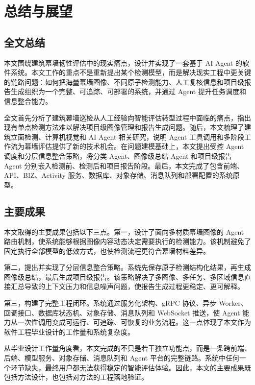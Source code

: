 \chapter{总结与展望}
\label{chap:conclusion}

\section{全文总结}
\label{sec:conclusion-summary}

本文围绕建筑幕墙韧性评估中的现实痛点，设计并实现了一套基于 AI Agent 的软件系统。本文工作的重点不是重新提出某个检测模型，而是解决现实工程中更关键的链路问题：如何把海量幕墙图像、不同原子检测能力、人工复核信息和项目级报告生成组织为一个完整、可追踪、可部署的系统，并通过 Agent 提升任务调度和信息整合能力。

全文首先分析了建筑幕墙巡检从人工经验向智能评估转型过程中面临的痛点，指出现有单点检测方法难以解决项目级图像管理和报告生成问题。随后，本文梳理了建筑立面检测、计算机视觉和 AI Agent 相关研究，说明 Agent 工具调用和多阶段工作流为幕墙评估提供了新的技术机会。在问题建模基础上，本文提出受控 Agent 调度和分层信息整合策略，将分类 Agent、图像级总结 Agent 和项目级报告 Agent 分别嵌入检测前、检测后和项目报告阶段。最后，本文完成了包含前端、API、BIZ、Activity 服务、数据库、对象存储、消息队列和部署配置的系统原型。

\section{主要成果}
\label{sec:conclusion-results}

本文取得的主要成果包括以下三点。第一，设计了面向多材质幕墙图像的 Agent 路由机制，使系统能够根据图像内容动态决定需要执行的检测能力。该机制避免了固定执行全部模型的低效方式，也使检测流程更符合幕墙材料差异。

第二，提出并实现了分层信息整合策略。系统先保存原子检测结构化结果，再生成图像级总结，最后生成项目级报告。该策略解决了多图像、多任务、多区域信息直接汇总导致的上下文压力和信息噪声问题，使报告生成过程更稳定、更可解释。

第三，构建了完整工程闭环。系统通过服务化架构、gRPC 协议、异步 Worker、回调接口、数据库状态机、对象存储、消息队列和 WebSocket 推送，使 Agent 能力从一次性调用变成可运行、可追踪、可恢复的业务流程。这一点体现了本文作为软件工程毕业设计的工作量和系统复杂度。

从毕业设计工作量角度看，本文完成的不只是若干独立功能点，而是一条跨前端、后端、模型服务、对象存储、消息队列和 Agent 平台的完整链路。系统中任何一个环节缺失，最终用户都无法获得稳定的智能评估体验。因此，本文的主要成果既包括方法设计，也包括对方法的工程落地验证。


